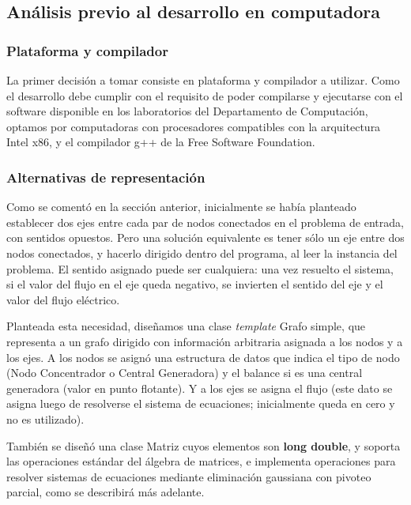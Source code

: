 \subsection{An\'alisis previo al desarrollo en computadora}

\subsubsection{Plataforma y compilador}

La primer decisi\'on a tomar consiste en plataforma y compilador a utilizar. Como el desarrollo debe cumplir con el requisito de poder compilarse y ejecutarse con el software disponible en los laboratorios del Departamento de Computaci\'on, optamos por computadoras con procesadores compatibles con la arquitectura Intel x86, y el compilador g++ de la Free Software Foundation.

\subsubsection{Alternativas de representaci\'on}

Como se coment\'o en la secci\'on anterior, inicialmente se hab\'ia planteado establecer dos ejes entre cada par de nodos conectados en el problema de entrada, con sentidos opuestos.
Pero una soluci\'on equivalente es tener s\'olo un eje entre dos nodos conectados, y hacerlo dirigido dentro del programa, al leer la instancia del problema. El sentido asignado puede ser cualquiera: una vez resuelto el sistema, si el valor del flujo en el eje queda negativo, se invierten el sentido del eje y el valor del flujo el\'ectrico.

Planteada esta necesidad, dise\~namos una clase \emph{template} Grafo simple, que representa a un grafo dirigido con informaci\'on arbitraria asignada a los nodos y a los ejes. A los nodos se asign\'o una estructura de datos que indica el tipo de nodo (Nodo Concentrador o Central Generadora) y el balance si es una central generadora (valor en punto flotante). Y a los ejes se asigna el flujo (este dato se asigna luego de resolverse el sistema de ecuaciones; inicialmente queda en cero y no es utilizado).

Tambi\'en se dise\~n\'o una clase Matriz cuyos elementos son \textbf{long double}, y soporta las operaciones est\'andar del \'algebra de matrices, e implementa operaciones para resolver sistemas de ecuaciones mediante eliminaci\'on gaussiana con pivoteo parcial, como se describir\'a m\'as adelante.

